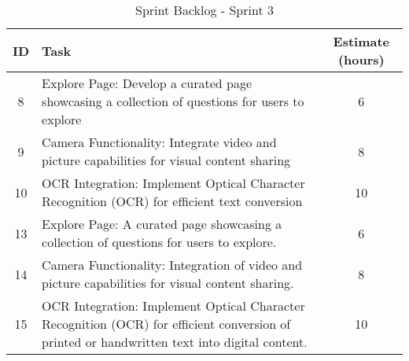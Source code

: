\begin{table}[h]
    \centering
    \caption*{Sprint Backlog - Sprint 3}
    \begin{tabular}{|c|p{5cm}|c|}
        \hline
        \textbf{ID} & \textbf{Task} & \textbf{Estimate (hours)} \\
        \hline
        8 & Explore Page: Develop a curated page showcasing a collection of questions for users to explore & 6 \\
        \hline
        9 & Camera Functionality: Integrate video and picture capabilities for visual content sharing & 8 \\
        \hline
        10 & OCR Integration: Implement Optical Character Recognition (OCR) for efficient text conversion & 10 \\
        \hline
        13 & Explore Page: A curated page showcasing a collection of questions for users to explore. & 6 \\
        \hline
        14 & Camera Functionality: Integration of video and picture capabilities for visual content sharing. & 8 \\
        \hline
        15 & OCR Integration: Implement Optical Character Recognition (OCR) for efficient conversion of printed or handwritten text into digital content. & 10 \\
        \hline
    \end{tabular}
\end{table}
